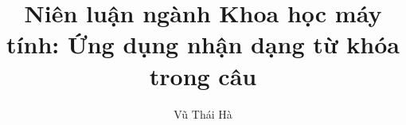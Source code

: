 \usepackage[margin=2.5cm,left=4cm]{geometry}
\usepackage[utf8]{vietnam} %
\usepackage{amsfonts,amsmath,amsthm,amssymb} %
\usepackage{enumitem,multicol,multirow,longtable,cellspace} %
\usepackage{indentfirst}
\usepackage{tikz,graphicx,wrapfig,xcolor} %
\usepackage{ragged2e,changepage} %
\usepackage{titlesec,caption} %
\usepackage{microtype}
\usepackage[hidelinks,unicode,pdfusetitle]{hyperref}
\usepackage[backend=biber,style=numeric,uniquelist=false]{biblatex} %
\usepackage{dashrule} %
\renewcommand{\baselinestretch}{1.3}
\setlength{\parindent}{1cm}
\setlength{\parskip}{4pt}

\setlength{\cellspacetoplimit}{4pt}
\setlength{\cellspacebottomlimit}{4pt}

\captionsetup{
	format=plain,
	justification=centering,
	labelsep=period,
	labelfont=bf,
	font=small,
}


\graphicspath{ {images/} }

\usetikzlibrary{calc}


\everymath{\displaystyle}

\theoremstyle{definition}
\newtheorem{definition}{Định nghĩa}[chapter]
\newtheorem{example}{Ví dụ}[chapter]
\newtheorem{theorem}{Định lý}[chapter]
\newtheorem{consequence}{Hệ quả}[chapter]
\newtheorem{exercise}{Bài tập}[chapter]

\newenvironment{mBlock}[1]{\noindent\textbf{#1:} }{}

\title{Niên luận ngành Khoa học máy tính: Ứng dụng nhận dạng từ khóa trong câu}
\author{Vũ Thái Hà}
\date{\the\year{}}


